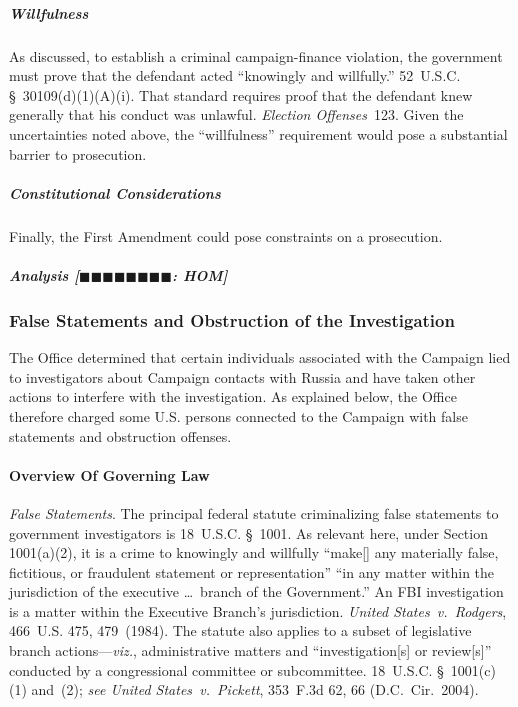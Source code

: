 \subparagraph{Willfulness}
As discussed, to establish a criminal campaign-finance violation, the government must prove that the defendant acted ``knowingly and willfully.''
52~U.S.C. \S~30109(d)(1)(A)(i).
That standard requires proof that the defendant knew generally that his conduct was unlawful.
\textit{Election Offenses}~123.
Given the uncertainties noted above, the ``willfulness'' requirement would pose a substantial barrier to prosecution.

\subparagraph{Constitutional Considerations}
Finally, the First Amendment could pose constraints on a prosecution.

\subparagraph{Analysis [$\blacksquare\blacksquare\blacksquare\blacksquare\blacksquare\blacksquare\blacksquare\blacksquare$: HOM]}



\subsubsection{False Statements and Obstruction of the Investigation}
The Office determined that certain individuals associated with the Campaign lied to investigators about Campaign contacts with Russia and have taken other actions to interfere with the investigation.
As explained below, the Office therefore charged some U.S. persons connected to the Campaign with false statements and obstruction offenses.

\paragraph{Overview Of Governing Law}
\textit{False Statements}.
The principal federal statute criminalizing false statements to government investigators is 18~U.S.C. \S~1001.
As relevant here, under Section 1001(a)(2), it is a crime to knowingly and willfully ``make[] any materially false, fictitious, or fraudulent statement or representation'' ``in any matter within the jurisdiction of the executive \dots\ branch of the Government.''
An FBI investigation is a matter within the Executive Branch's jurisdiction.
\textit{United States~v.\ Rodgers}, 466~U.S. 475, 479~(1984).
The statute also applies to a subset of legislative branch actions---\textit{viz.}, administrative matters and ``investigation[s] or review[s]'' conducted by a congressional committee or subcommittee.
18~U.S.C. \S~1001(c)(1) and~(2); \textit{see United States~v.\ Pickett}, 353~F.3d 62, 66 (D.C.~Cir.~2004).

